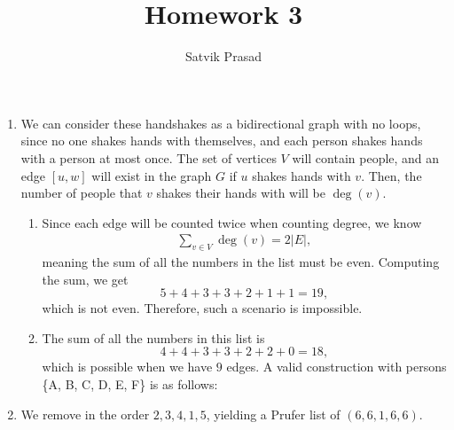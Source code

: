 \documentclass[12pt]{article}
\title{Homework 3}
\author{Satvik Prasad}
\date{}
\begin{document}
\begin{enumerate}
  \item We can consider these handshakes as a bidirectional graph
    with no loops, since no one shakes hands with themselves, and
    each person shakes hands with a person at most once. The set of
    vertices $V$ will contain people, and an edge $[u, w]$ will exist
    in the graph $G$ if $u$ shakes hands with $v.$ Then, the number
    of people that $v$ shakes their hands with will be $\deg(v).$
    \begin{enumerate}
      \item Since each edge will be counted twice when counting degree, we know
        \begin{align*}
          \sum_{v \in V}\deg (v) = 2|E|,
        \end{align*}
        meaning the sum of all the numbers in the list must be even.
        Computing the sum, we get $$5 + 4 + 3 + 3 + 2 + 1 + 1 = 19,$$
        which is not even. Therefore, such a scenario is impossible.

      \item The sum of all the numbers in this list is $$4 + 4 + 3 +
        3 + 2 + 2 + 0 = 18,$$
        which is possible when we have $9$ edges. A valid
        construction with persons \{A, B, C, D, E, F\} is as follows:
        \begin{center}

        \end{center}
    \end{enumerate}
  \item We remove in the order $2, 3, 4, 1, 5$, yielding a Prufer
    list of $(6, 6, 1, 6, 6).$


\end{enumerate}
\end{document}
